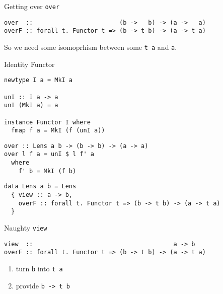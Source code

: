 \documentclass[presentation,aspectratio=169,8pt]{beamer}
\begin{document}
\begin{frame}[label={sec:orgd65d1a2},fragile]{Getting over \texttt{over}}
 \begin{verbatim}
over  ::                        (b ->   b) -> (a ->   a)
overF :: forall t. Functor t => (b -> t b) -> (a -> t a)
\end{verbatim}

\pause

So we need some isomoprhism between some \texttt{t a} and \texttt{a}.
\end{frame}

\begin{frame}[label={sec:orgb508df8},fragile]{Identity Functor}
 \begin{verbatim}
newtype I a = MkI a

unI :: I a -> a
unI (MkI a) = a

instance Functor I where
  fmap f a = MkI (f (unI a))
\end{verbatim}

\pause

\begin{verbatim}
over :: Lens a b -> (b -> b) -> (a -> a)
over l f a = unI $ l f' a
  where
    f' b = MkI (f b)
\end{verbatim}

\pause

\begin{verbatim}
data Lens a b = Lens
  { view :: a -> b,
    overF :: forall t. Functor t => (b -> t b) -> (a -> t a)
  }
\end{verbatim}
\end{frame}

\begin{frame}[label={sec:org7e11063},fragile]{Naughty \texttt{view}}
 \begin{verbatim}
view  ::                                       a -> b
overF :: forall t. Functor t => (b -> t b) -> (a -> t a)
\end{verbatim}

\pause

\begin{enumerate}
\item turn \texttt{b} into \texttt{t a}
\item provide \texttt{b -> t b}
\end{enumerate}
\end{frame}
\end{document}
